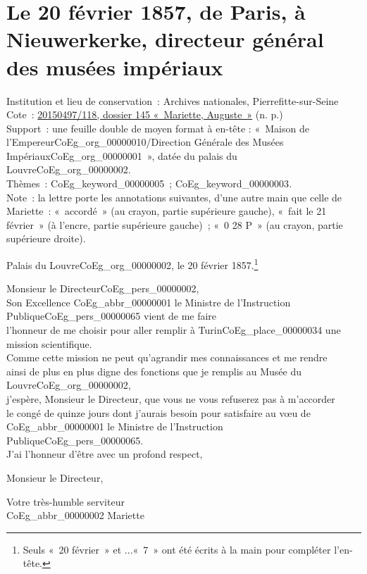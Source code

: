\documentclass{book}
\begin{document}
\hypertarget{CoEg_Mariette_1857-02-20}{}
\section*{Le 20 février 1857, de Paris, à Nieuwerkerke, directeur général des musées impériaux}  
{\footnotesize \noindent Institution et lieu de conservation~: Archives nationales, Pierrefitte-sur-Seine\\
Cote~: \hyperlink{CoEg_Mariette_ms_001}{20150497/118, dossier 145 «~Mariette, Auguste~»} (n. p.)\\
Support~: une feuille double de moyen format à en-tête : «~Maison de l'Empereur\gls{CoEg_org_00000010}/Direction Générale des Musées Impériaux\gls{CoEg_org_00000001}~», datée du palais du Louvre\gls{CoEg_org_00000002}.\\
Thèmes~: \gls{CoEg_keyword_00000005}~; \gls{CoEg_keyword_00000003}.\\
Note~: la lettre porte les annotations suivantes, d’une autre main que celle de Mariette~: «~accordé~» (au crayon, partie supérieure gauche), «~fait le 21 février~» (à l’encre, partie supérieure gauche)~; «~0 28 P~» (au crayon, partie supérieure droite).}
\begin{flushright}Palais du Louvre\gls{CoEg_org_00000002}, le 20 février 1857.\footnote{Seuls «~20 février~» et ...«~7~» ont été écrits à la main pour compléter l’en-tête.}\end{flushright} 

\hspace{1cm} Monsieur le Directeur\gls{CoEg_pers_00000002},\\

Son Excellence \gls{CoEg_abbr_00000001} le Ministre de l’Instruction Publique\gls{CoEg_pers_00000065} vient de me faire\\
l’honneur de me choisir pour aller remplir à Turin\gls{CoEg_place_00000034} une mission scientifique.\\
Comme cette mission ne peut qu’agrandir mes connaissances et me rendre\\
ainsi de plus en plus digne des fonctions que je remplis au Musée du Louvre\gls{CoEg_org_00000002},\\
j’espère, Monsieur le Directeur, que vous ne vous refuserez pas à m’accorder\\
le congé de quinze jours dont j’aurais besoin pour satisfaire au vœu de\\
\gls{CoEg_abbr_00000001} le Ministre de l’Instruction Publique\gls{CoEg_pers_00000065}.\\
\indent J’ai l’honneur d’être avec un profond respect,
\begin{center}Monsieur le Directeur,\end{center}
\begin{center}\hspace{5cm}Votre très-humble serviteur\\
\hspace{5cm} \gls{CoEg_abbr_00000002} Mariette\end{center}
\end{document}
